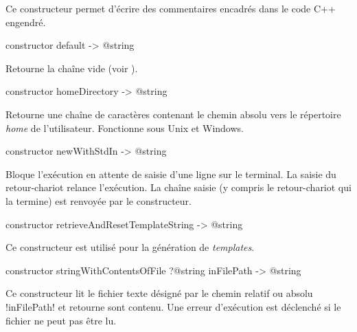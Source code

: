 Ce constructeur permet d'écrire des commentaires encadrés dans le code C++ engendré.



\begin{galgasbox}
constructor default -> @string
\end{galgasbox}

Retourne la chaîne vide (voir ).





\begin{galgasbox}
constructor homeDirectory -> @string
\end{galgasbox}

Retourne une chaîne de caractères contenant le chemin absolu vers le répertoire \emph{home} de l'utilisateur. Fonctionne sous Unix et Windows.





\begin{galgasbox}
constructor newWithStdIn -> @string
\end{galgasbox}

Bloque l'exécution en attente de saisie d'une ligne sur le terminal. La saisie du retour-chariot relance l'exécution. La chaîne saisie (y compris le retour-chariot qui la termine) est renvoyée par le constructeur.







\begin{galgasbox}
constructor retrieveAndResetTemplateString -> @string
\end{galgasbox}

Ce constructeur est utilisé pour la génération de \emph{templates}.





\begin{galgasbox}
constructor stringWithContentsOfFile ?@string inFilePath -> @string
\end{galgasbox}

Ce constructeur lit le fichier texte désigné par le chemin relatif ou absolu \ggs!inFilePath! et retourne sont contenu. Une erreur d'exécution est déclenché si le fichier ne peut pas être lu.






